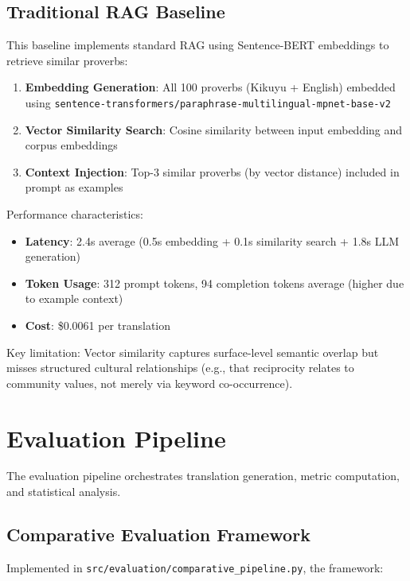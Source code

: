 \subsection{Traditional RAG Baseline}
\label{subsec:traditional_rag_baseline}

This baseline implements standard RAG using Sentence-BERT embeddings to retrieve similar proverbs:

\begin{enumerate}
    \item \textbf{Embedding Generation}: All 100 proverbs (Kikuyu + English) embedded using \texttt{sentence-transformers/paraphrase-multilingual-mpnet-base-v2}
    \item \textbf{Vector Similarity Search}: Cosine similarity between input embedding and corpus embeddings
    \item \textbf{Context Injection}: Top-3 similar proverbs (by vector distance) included in prompt as examples
\end{enumerate}

Performance characteristics:
\begin{itemize}
    \item \textbf{Latency}: 2.4s average (0.5s embedding + 0.1s similarity search + 1.8s LLM generation)
    \item \textbf{Token Usage}: 312 prompt tokens, 94 completion tokens average (higher due to example context)
    \item \textbf{Cost}: \$0.0061 per translation
\end{itemize}

Key limitation: Vector similarity captures surface-level semantic overlap but misses structured cultural relationships (e.g., that reciprocity relates to community values, not merely via keyword co-occurrence).

\section{Evaluation Pipeline}
\label{sec:eval_pipeline}

The evaluation pipeline orchestrates translation generation, metric computation, and statistical analysis.

\subsection{Comparative Evaluation Framework}
\label{subsec:comparative_framework}

Implemented in \texttt{src/evaluation/comparative\_pipeline.py}, the framework:

